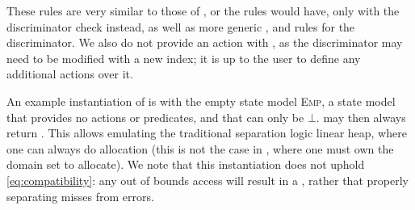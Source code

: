 
These rules are very similar to those of \PMap, or the rules \List{} would have, only with the discriminator check instead, as well as more generic \consume, \produce{} and \fix{} rules for the discriminator. We also do not provide an \alloc{} action with \GMap, as the discriminator may need to be modified with a new index; it is up to the user to define any additional actions over it.

An example instantiation of \GMap{} is with the empty state model \textsc{Emp}, a state model that provides no actions or predicates, and that can only be $\bot$.  may then always return \vtrue. This allows emulating the traditional separation logic linear heap, where one can always do allocation (this is not the case in \PMap{}, where one must own the domain set to allocate). We note that this instantiation does not uphold \ref{eq:compatibility}: any out of bounds access will result in a \Miss{}, rather that properly separating misses from errors.
